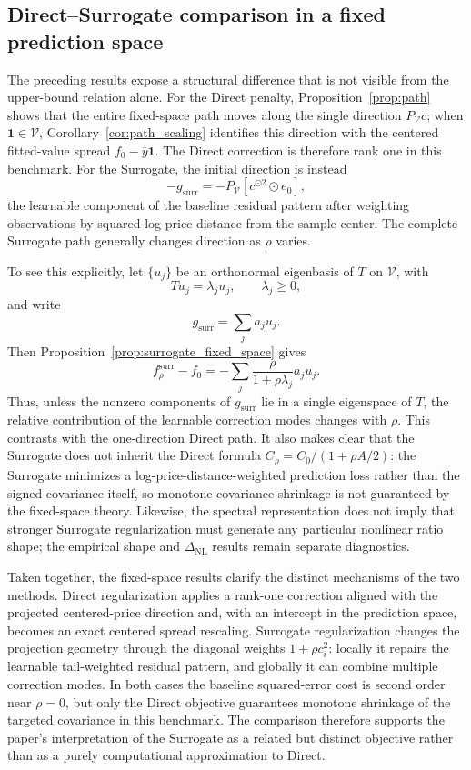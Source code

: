 \documentclass[10pt]{article}
\theoremstyle{definition}
\newcommand{\1}{\mathbf{1}}
\newcommand{\Vcal}{\mathcal{V}}
\begin{document}
\subsection{Direct--Surrogate comparison in a fixed prediction space}

{The preceding results expose a structural difference that is not visible from the upper-bound relation alone. For the Direct penalty, Proposition~\ref{prop:path} shows that the entire fixed-space path moves along the single direction $P_{\Vcal}c$; when $\1\in\Vcal$, Corollary~\ref{cor:path_scaling} identifies this direction with the centered fitted-value spread $f_0-\bar y\1$. The Direct correction is therefore rank one in this benchmark. For the Surrogate, the initial direction is instead
\[
-g_{\mathrm{surr}}
=
-P_{\Vcal}
\left[c^{\odot2}\odot e_0\right],
\]
the learnable component of the baseline residual pattern after weighting observations by squared log-price distance from the sample center. The complete Surrogate path generally changes direction as $\rho$ varies.}

{To see this explicitly, let $\{u_j\}$ be an orthonormal eigenbasis of $T$ on $\Vcal$, with
\[
Tu_j=\lambda_j u_j,
\qquad
\lambda_j\geq0,
\]
and write
\[
g_{\mathrm{surr}}=\sum_j a_j u_j.
\]
Then Proposition~\ref{prop:surrogate_fixed_space} gives
\begin{equation}
\label{eq:surrogate_spectral_path}
f_\rho^{\mathrm{surr}}-f_0
=
-\sum_j
\frac{\rho}{1+\rho\lambda_j}
a_j u_j.
\end{equation}
Thus, unless the nonzero components of $g_{\mathrm{surr}}$ lie in a single eigenspace of $T$, the relative contribution of the learnable correction modes changes with $\rho$. This contrasts with the one-direction Direct path. It also makes clear that the Surrogate does not inherit the Direct formula
$C_\rho=C_0/(1+\rho A/2)$: the Surrogate minimizes a log-price-distance-weighted prediction loss rather than the signed covariance itself, so monotone covariance shrinkage is not guaranteed by the fixed-space theory. Likewise, the spectral representation does not imply that stronger Surrogate regularization must generate any particular nonlinear ratio shape; the empirical shape and $\Delta_{\mathrm{NL}}$ results remain separate diagnostics.}


{
Taken together, the fixed-space results clarify the distinct mechanisms of the two methods. Direct regularization applies a rank-one correction aligned with the projected centered-price direction and, with an intercept in the prediction space, becomes an exact centered spread rescaling. Surrogate regularization changes the projection geometry through the diagonal weights $1+\rho c_i^2$: locally it repairs the learnable tail-weighted residual pattern, and globally it can combine multiple correction modes. In both cases the baseline squared-error cost is second order near $\rho=0$, but only the Direct objective guarantees monotone shrinkage of the targeted covariance in this benchmark. The comparison therefore supports the paper's interpretation of the Surrogate as a related but distinct objective rather than as a purely computational approximation to Direct.
}
\end{document}
